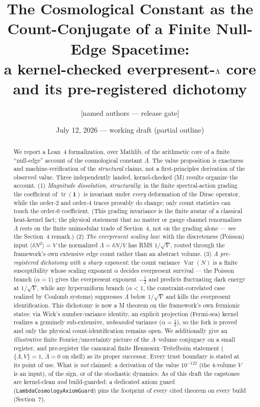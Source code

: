 \documentclass[11pt]{article}
\title{The Cosmological Constant as the Count-Conjugate of a Finite
Null-Edge Spacetime:\\ a kernel-checked everpresent-$\Lam$ core and its
pre-registered dichotomy}
\author{[named authors --- release gate]}
\date{July 12, 2026 --- working draft (partial outline)}
\newcommand{\Lam}{\Lambda}
\newcommand{\Kernel}{\textcolor{kcol}{\textsc{M}}}       %
\newcommand{\lm}[1]{\texttt{#1}}
\begin{document}
\maketitle

\begin{abstract}
We report a Lean~4 formalization, over Mathlib, of the arithmetic core of a
finite ``null-edge'' account of the cosmological constant $\Lam$.  The value
proposition is exactness and machine-verification of the \emph{structural}
claims, not a first-principles derivation of the observed value.  Three
independently landed, kernel-checked (\Kernel) results organize the account.
(1) \emph{Magnitude dissolution, structurally}: in the finite spectral-action
grading the coefficient of $\operatorname{tr}(\mathbf 1)$ is invariant under
\emph{every} deformation of the Dirac operator, while the order-2 and order-4
traces provably do change; only count statistics can touch the order-0
coefficient.  (This grading invariance is the finite avatar of a classical
heat-kernel fact; the physical statement that no matter or gauge channel
renormalizes $\Lam$ rests on the finite unimodular trade of Section~4, not on
the grading alone --- see the Section~4 remark.)
(2) \emph{The everpresent scaling law}: with the discreteness (Poisson) input
$\langle\delta N^2\rangle = V$ the normalized $\Lam = \delta N/V$ has RMS
$1/\sqrt V$, routed through the framework's own extensive edge count rather than
an abstract volume.  (3) \emph{A pre-registered dichotomy with a sharp
exponent}: the count variance $\operatorname{Var}(N)$ is a finite susceptibility
whose scaling exponent $\alpha$ decides everpresent survival --- the Poisson
branch ($\alpha=1$) gives the everpresent exponent $-\tfrac12$ and predicts
fluctuating dark energy at $1/\sqrt V$, while any hyperuniform branch
($\alpha<1$, the constraint-correlated case realized by Coulomb systems)
suppresses $\Lam$ below $1/\sqrt V$ and kills the everpresent identification.
This dichotomy is now a \Kernel{} theorem on the framework's own fermionic states:
via Wick's number-variance identity, an explicit projection (Fermi-sea) kernel
realizes a genuinely sub-extensive, \emph{unbounded} variance ($\alpha=\tfrac12$),
so the fork is proved and only the physical count-identification remains open.
We additionally give an \emph{illustrative} finite Fourier/uncertainty picture of
the $\Lam$--volume conjugacy on a small register, and pre-register the canonical
finite Henneaux--Teitelboim statement ($\{\Lam,V\}=1$, $\dot\Lam=0$ on shell) as
its proper successor.  Every trust boundary is stated at its
point of use.  What is \emph{not} claimed: a derivation of the value
$10^{-122}$ (the 4-volume $V$ is an input), of the sign, or of the stochastic
dynamics.  As of this draft the capstones are kernel-clean \emph{and}
build-guarded: a dedicated axiom guard (\lm{LambdaCosmologyAxiomGuard}) pins the
footprint of every cited theorem on every build (Section~7).
\end{abstract}
\end{document}
